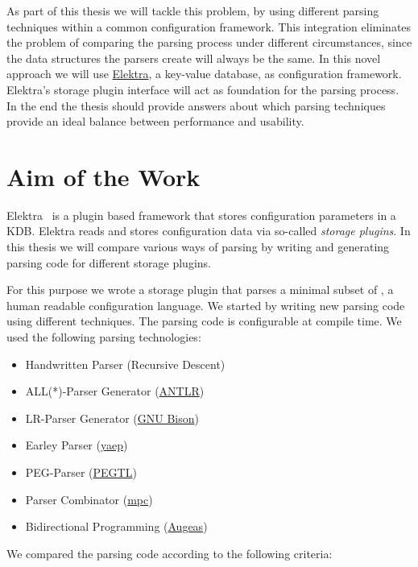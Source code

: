 As part of this thesis we will tackle this problem, by using different parsing techniques within a common configuration framework. This integration eliminates the problem of comparing the parsing process under different circumstances, since the data structures the parsers create will always be the same. In this novel approach we will use \href{http://web.libelektra.org}{Elektra}, a key-value database, as configuration framework. Elektra’s storage plugin interface will act as foundation for the parsing process. In the end the thesis should provide answers about which parsing techniques provide an ideal balance between performance and usability.

\section{Aim of the Work}
\label{sec:Aim_Of_The_Work}

Elektra~\cite{raab2010modular} is a plugin based framework that stores configuration parameters in a \glsdesc{KDB}. Elektra reads and stores configuration data via so-called \emph{storage plugins}. In this thesis we will compare various ways of parsing by writing and generating parsing code for different storage plugins.

For this purpose we wrote a storage plugin that parses a minimal subset of , a human readable configuration language. We started by writing new parsing code using different techniques. The parsing code is configurable at compile time. We used the following parsing technologies:

\begin{itemize}
  \item Handwritten Parser (Recursive Descent)
  \item ALL(*)-Parser Generator (\href{http://www.antlr.org}{ANTLR})
  \item LR-Parser Generator (\href{https://www.gnu.org/software/bison}{GNU Bison})
  \item Earley Parser (\href{https://github.com/vnmakarov/yaep}{yaep})
  \item PEG-Parser (\href{https://github.com/ColinH/PEGTL}{PEGTL})
  \item Parser Combinator (\href{https://github.com/orangeduck/mpc}{mpc})
  \item Bidirectional Programming (\href{http://augeas.net}{Augeas})
\end{itemize}

We compared the parsing code according to the following criteria:

